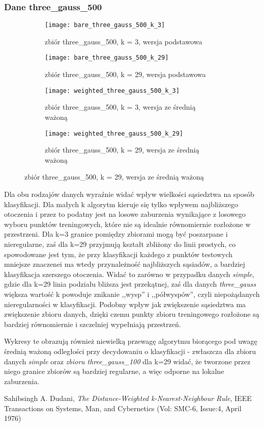\documentclass{scrartcl}
\begin{document}
\subsubsection*{Dane three\_gauss\_500}

\begin{figure}[H]
	\centering
	\begin{subfigure}[b]{0.4\linewidth}
		\texttt{[image: bare\_three\_gauss\_500\_k\_3]}
		\caption{zbiór three\_gauss\_500, k = 3, wersja podstawowa}
	\end{subfigure}
	\begin{subfigure}[b]{0.4\linewidth}
		\texttt{[image: bare\_three\_gauss\_500\_k\_29]}
		\caption{zbiór three\_gauss\_500, k = 29, wersja podstawowa}
	\end{subfigure}
	\begin{subfigure}[b]{0.4\linewidth}
		\texttt{[image: weighted\_three\_gauss\_500\_k\_3]}
		\caption{zbiór three\_gauss\_500, k = 3, wersja ze średnią ważoną}
	\end{subfigure}
	\begin{subfigure}[b]{0.4\linewidth}
		\texttt{[image: weighted\_three\_gauss\_500\_k\_29]}
		\caption{zbiór three\_gauss\_500, k = 29, wersja ze średnią ważoną}
	\end{subfigure}
\end{figure}

Dla obu rodzajów danych wyraźnie widać wpływ wielkości sąsiedztwa na sposób klasyfikacji. Dla małych k algorytm kieruje się tylko wpływem najbliższego otoczenia i przez to podatny jest na losowe zaburzenia wynikające z losowego wyboru punktów treningowych, które nie są idealnie równomiernie rozłożone w przestrzeni. Dla k=3 granice pomiędzy zbiorami mogą być poszarpane i nieregularne, zaś dla k=29 przyjmują kształt zbliżony do linii prostych, co spowodowane jest tym, że przy klasyfikacji każdego z punktów testowych mniejsze znaczenei ma wtedy przynależność najbliższych sąsiadów, a bardziej klasyfikacja szerszego otoczenia. Widać to zarówno w przypadku danych \textit{simple}, gdzie dla k=29 linia podziału bliższa jest przekątnej, zaś dla danych \textit{three\_gauss} większa wartość k powoduje znikanie ,,wysp'' i ,,półwyspów'', czyli niepożądanych nieregularności w klasyfikacji. Podobny wpływ jak zwiększenie sąsiedztwa ma zwiększenie zbioru danych, dzięki czemu punkty zbioru treningowego rozłożone są bardziej równomiernie i szczelniej wypełniają przestrzeń. 

Wykresy te obrazują również niewielką przewagę algorytmu biorącego pod uwagę średnią ważoną odległości przy decydowaniu o klasyfikacji - zwłaszcza dla zbioru danych \textit{simple} oraz \textit{zbioru three\_gauss\_100} dla k=29 widać, że tworzone przez niego granice zbiorów są bardziej regularne, a więc odporne na lokalne zaburzenia.


\begin{thebibliography}{1}
Sahibsingh A. Dudani, 
\textit{The Distance-Weighted k-Nearest-Neighbour Rule},
IEEE Transactions on Systems, Man, and Cybernetics (Vol: SMC-6, Issue:4, April 1976)
\end{thebibliography}
\end{document}

